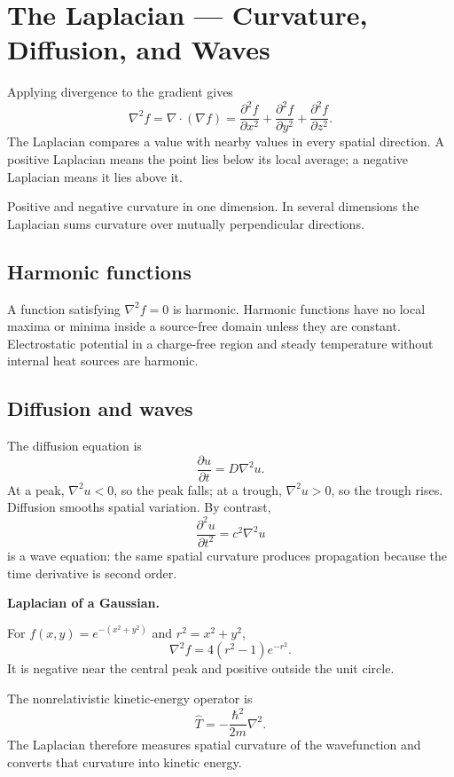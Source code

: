 \section{The Laplacian --- Curvature, Diffusion, and Waves}
\label{sec:laplacian}

Applying divergence to the gradient gives
\[
\boxed{\nabla^2 f=\nabla\cdot(\nabla f)
=\frac{\partial^2f}{\partial x^2}+
\frac{\partial^2f}{\partial y^2}+
\frac{\partial^2f}{\partial z^2}.}
\]
The Laplacian compares a value with nearby values in every spatial direction. A positive Laplacian means the point lies below its local average; a negative Laplacian means it lies above it.

\begin{bookfigure}{Positive and negative curvature in one dimension. In several dimensions the Laplacian sums curvature over mutually perpendicular directions.}

\label{fig:laplacian-curvature}
\end{bookfigure}

\subsection{Harmonic functions}
A function satisfying $\nabla^2 f=0$ is harmonic. Harmonic functions have no local maxima or minima inside a source-free domain unless they are constant. Electrostatic potential in a charge-free region and steady temperature without internal heat sources are harmonic.

\subsection{Diffusion and waves}
The diffusion equation is
\[
\boxed{\frac{\partial u}{\partial t}=D\nabla^2u.}
\]
At a peak, $\nabla^2u<0$, so the peak falls; at a trough, $\nabla^2u>0$, so the trough rises. Diffusion smooths spatial variation. By contrast,
\[
\frac{\partial^2u}{\partial t^2}=c^2\nabla^2u
\]
is a wave equation: the same spatial curvature produces propagation because the time derivative is second order.

\begin{workedexample}
\textbf{Laplacian of a Gaussian.}\par
For $f(x,y)=e^{-(x^2+y^2)}$ and $r^2=x^2+y^2$,
\[
\nabla^2f=4(r^2-1)e^{-r^2}.
\]
It is negative near the central peak and positive outside the unit circle.
\end{workedexample}

\begin{keyidea}
The nonrelativistic kinetic-energy operator is
\[
\widehat T=-\frac{\hbar^2}{2m}\nabla^2.
\]
The Laplacian therefore measures spatial curvature of the wavefunction and converts that curvature into kinetic energy.
\end{keyidea}
